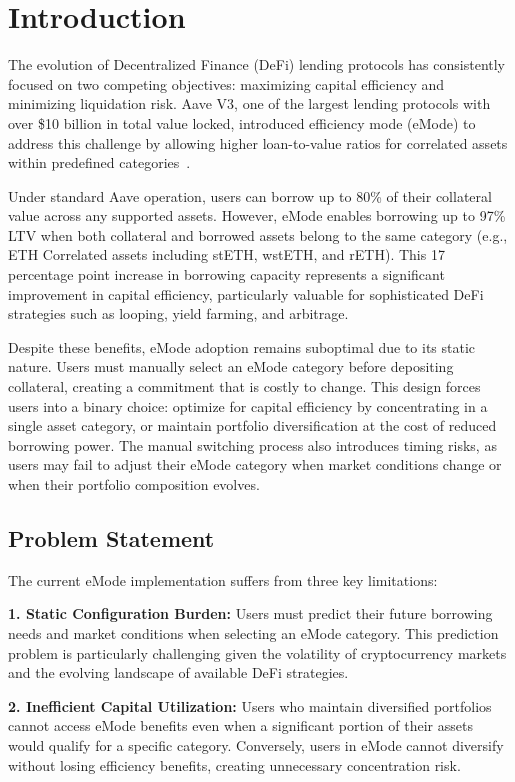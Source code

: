 \section{Introduction}

The evolution of Decentralized Finance (DeFi) lending protocols has consistently focused on two competing objectives: maximizing capital efficiency and minimizing liquidation risk. Aave V3, one of the largest lending protocols with over \$10 billion in total value locked, introduced efficiency mode (eMode) to address this challenge by allowing higher loan-to-value ratios for correlated assets within predefined categories~\cite{aave-v3-whitepaper}.

Under standard Aave operation, users can borrow up to 80\% of their collateral value across any supported assets. However, eMode enables borrowing up to 97\% LTV when both collateral and borrowed assets belong to the same category (e.g., ETH Correlated assets including stETH, wstETH, and rETH). This 17 percentage point increase in borrowing capacity represents a significant improvement in capital efficiency, particularly valuable for sophisticated DeFi strategies such as looping, yield farming, and arbitrage.

Despite these benefits, eMode adoption remains suboptimal due to its static nature. Users must manually select an eMode category before depositing collateral, creating a commitment that is costly to change. This design forces users into a binary choice: optimize for capital efficiency by concentrating in a single asset category, or maintain portfolio diversification at the cost of reduced borrowing power. The manual switching process also introduces timing risks, as users may fail to adjust their eMode category when market conditions change or when their portfolio composition evolves.

\subsection{Problem Statement}

The current eMode implementation suffers from three key limitations:

\textbf{1. Static Configuration Burden:} Users must predict their future borrowing needs and market conditions when selecting an eMode category. This prediction problem is particularly challenging given the volatility of cryptocurrency markets and the evolving landscape of available DeFi strategies.

\textbf{2. Inefficient Capital Utilization:} Users who maintain diversified portfolios cannot access eMode benefits even when a significant portion of their assets would qualify for a specific category. Conversely, users in eMode cannot diversify without losing efficiency benefits, creating unnecessary concentration risk.

